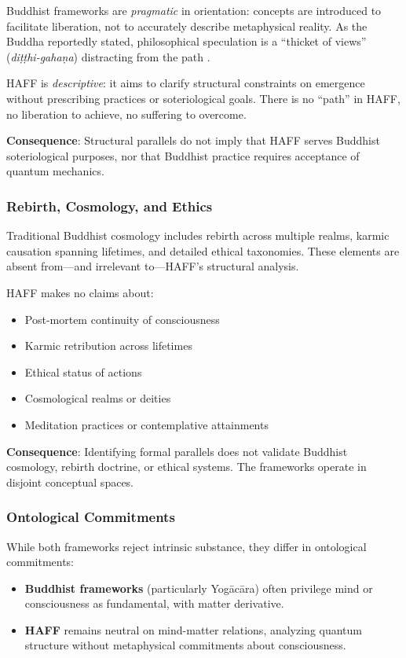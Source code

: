 \documentclass[11pt,a4paper]{article}
\begin{document}
Buddhist frameworks are \emph{pragmatic} in orientation: concepts are introduced to facilitate liberation, not to accurately describe metaphysical reality. As the Buddha reportedly stated, philosophical speculation is a ``thicket of views'' (\emph{di\d{t}\d{t}hi-gahaṇa}) distracting from the path \cite{SuttaNipata}.

HAFF is \emph{descriptive}: it aims to clarify structural constraints on emergence without prescribing practices or soteriological goals. There is no ``path'' in HAFF, no liberation to achieve, no suffering to overcome.

\textbf{Consequence}: Structural parallels do not imply that HAFF serves Buddhist soteriological purposes, nor that Buddhist practice requires acceptance of quantum mechanics.

\subsubsection{Rebirth, Cosmology, and Ethics}

Traditional Buddhist cosmology includes rebirth across multiple realms, karmic causation spanning lifetimes, and detailed ethical taxonomies. These elements are absent from—and irrelevant to—HAFF's structural analysis.

HAFF makes no claims about:
\begin{itemize}
\item Post-mortem continuity of consciousness
\item Karmic retribution across lifetimes
\item Ethical status of actions
\item Cosmological realms or deities
\item Meditation practices or contemplative attainments
\end{itemize}

\textbf{Consequence}: Identifying formal parallels does not validate Buddhist cosmology, rebirth doctrine, or ethical systems. The frameworks operate in disjoint conceptual spaces.

\subsubsection{Ontological Commitments}

While both frameworks reject intrinsic substance, they differ in ontological commitments:
\begin{itemize}
\item \textbf{Buddhist frameworks} (particularly Yog\=ac\=ara) often privilege mind or consciousness as fundamental, with matter derivative.
\item \textbf{HAFF} remains neutral on mind-matter relations, analyzing quantum structure without metaphysical commitments about consciousness.
\end{itemize}
\end{document}
